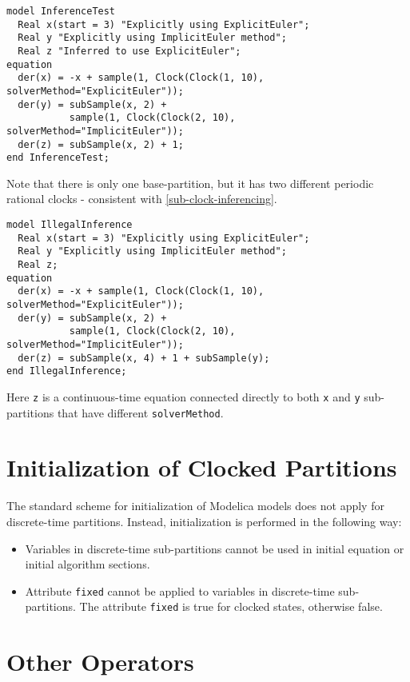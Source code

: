 \begin{example}
\begin{lstlisting}[language=modelica]
model InferenceTest
  Real x(start = 3) "Explicitly using ExplicitEuler";
  Real y "Explicitly using ImplicitEuler method";
  Real z "Inferred to use ExplicitEuler";
equation
  der(x) = -x + sample(1, Clock(Clock(1, 10), solverMethod="ExplicitEuler"));
  der(y) = subSample(x, 2) +
           sample(1, Clock(Clock(2, 10), solverMethod="ImplicitEuler"));
  der(z) = subSample(x, 2) + 1;
end InferenceTest;
\end{lstlisting}
Note that there is only one base-partition, but it has two different periodic rational clocks - consistent with \cref{sub-clock-inferencing}.

\begin{lstlisting}[language=modelica]
model IllegalInference
  Real x(start = 3) "Explicitly using ExplicitEuler";
  Real y "Explicitly using ImplicitEuler method";
  Real z;
equation
  der(x) = -x + sample(1, Clock(Clock(1, 10), solverMethod="ExplicitEuler"));
  der(y) = subSample(x, 2) +
           sample(1, Clock(Clock(2, 10), solverMethod="ImplicitEuler"));
  der(z) = subSample(x, 4) + 1 + subSample(y);
end IllegalInference;
\end{lstlisting}
Here \lstinline!z! is a continuous-time equation connected directly to both \lstinline!x! and \lstinline!y! sub-partitions that have different \lstinline!solverMethod!.
\end{example}

\section{Initialization of Clocked Partitions}\label{initialization-of-clocked-partitions}

The standard scheme for initialization of Modelica models does not apply for discrete-time partitions.
Instead, initialization is performed in the following way:
\begin{itemize}
\item
  Variables in discrete-time sub-partitions cannot be used in initial equation or initial algorithm sections.
\item
  Attribute \lstinline!fixed! cannot be applied to variables in discrete-time sub-partitions.
  The attribute \lstinline!fixed! is true for clocked states, otherwise false.
\end{itemize}

\section{Other Operators}\label{other-operators}

